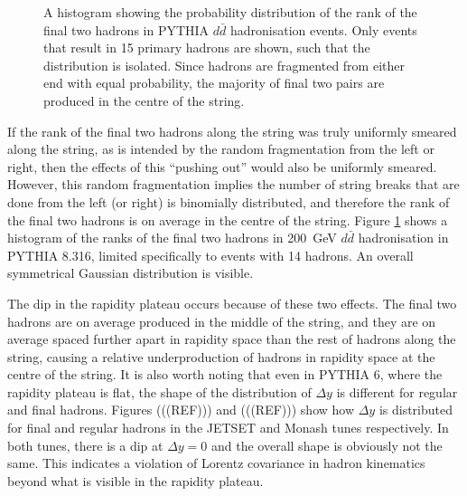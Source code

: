 \documentclass[12pt,a4paper]{report}
\begin{document}
\begin{figure}
  \centering
  
  \caption{A histogram showing the probability distribution of the rank of the final two hadrons in PYTHIA $d\bar{d}$ hadronisation events. Only events that result in 15 primary hadrons are shown, such that the distribution is isolated. Since hadrons are fragmented from either end with equal probability, the majority of final two pairs are produced in the centre of the string.}
  \label{fig:finaltworanks}
\end{figure}

If the rank of the final two hadrons along the string was truly uniformly smeared along the string, as is intended by the random fragmentation from the left or right, then the effects of this ``pushing out'' would also be uniformly smeared. However, this random fragmentation implies the number of string breaks that are done from the left (or right) is binomially distributed, and therefore the rank of the final two hadrons is on average in the centre of the string. Figure \ref{fig:finaltworanks} shows a histogram of the ranks of the final two hadrons in \qty{200}{\giga\electronvolt} $d\bar{d}$ hadronisation in PYTHIA 8.316, limited specifically to events with 14 hadrons. An overall symmetrical Gaussian distribution is visible.

The dip in the rapidity plateau occurs because of these two effects. The final two hadrons are on average produced in the middle of the string, and they are on average spaced further apart in rapidity space than the rest of hadrons along the string, causing a relative underproduction of hadrons in rapidity space at the centre of the string. It is also worth noting that even in PYTHIA 6, where the rapidity plateau is flat, the shape of the distribution of $\Delta y$ is different for regular and final hadrons. Figures (((REF))) and (((REF))) show how $\Delta y$ is distributed for final and regular hadrons in the JETSET and Monash tunes respectively. In both tunes, there is a dip at $\Delta y = 0$ and the overall shape is obviously not the same. This indicates a violation of Lorentz covariance in hadron kinematics beyond what is visible in the rapidity plateau.
\end{document}
